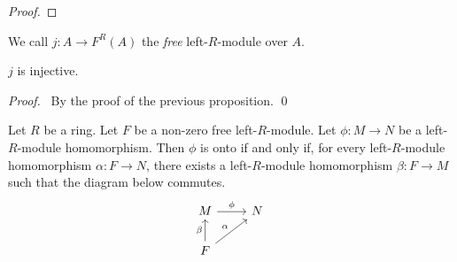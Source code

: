 \begin{proof}
\pf
{}
\end{proof}

\begin{df}
We call $j : A \rightarrow F^R(A)$ the \emph{free} left-$R$-module over $A$.
\end{df}

\begin{prop}
$j$ is injective.
\end{prop}

\begin{proof}
\pf\ By the proof of the previous proposition. \qed
\end{proof}

\begin{prop}
Let $R$ be a ring. Let $F$ be a non-zero free left-$R$-module. Let $\phi : M \rightarrow N$ be a left-$R$-module homomorphism. Then $\phi$ is onto if and only if, for every left-$R$-module homomorphism $\alpha : F \rightarrow N$, there exists a left-$R$-module homomorphism $\beta : F \rightarrow M$ such that the diagram below commutes.
\[ \begin{tikzcd}
M \arrow[r,"\phi"] & N \\
F \arrow[u,"\beta"] \arrow[ur,"\alpha"]
\end{tikzcd} \]
\end{prop}

